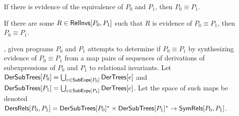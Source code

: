 \begin{ex}
  \label{ex:rel-invs}
\end{ex}

If there is evidence of the equivalence of $P_0$ and $P_1$, then $P_0
\equiv P_1$.
%
\begin{lemma}
  \label{lemma:equiv-evidence}
  If there are some $R \in \mathsf{RelInvs}[ P_0, P_1 ]$ such that $R$ is
  evidence of $P_0 \equiv P_1$, then $P_0 \equiv P_1$.
\end{lemma}

\sys, given programs $P_0$ and $P_1$ attempts to determine if $P_0
\equiv P_1$ by synthesizing evidence of $P_0 \equiv P_1$ from a map
pairs of sequences of derivations of subexpressions of $P_0$ and $P_1$
to relational invariants.
%
%
Let $\mathsf{DerSubTrees}[ P_0 ] = \bigcup_{e \in \mathsf{SubExps}[ P_0 ]} \mathsf{DerTrees}[  e
 ]$ and $\mathsf{DerSubTrees}[ P_1 ] = \bigcup_{e \in \mathsf{SubExps}[ P_1 ]} \mathsf{DerTrees}[ 
  e  ]$.
%
Let the space of such maps be denoted $\mathsf{DersRels}[ P_0, P_1 ] =
\mathsf{DerSubTrees}[ P_0 ]^{*} \times \mathsf{DerSubTrees}[ P_1 ]^{*} \to
\mathsf{SymRels}[ P_0, P_1 ]$.
%
